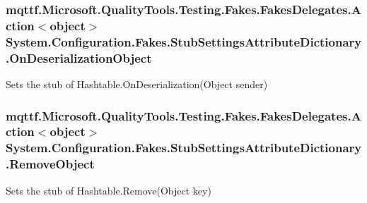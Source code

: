 \hypertarget{class_system_1_1_configuration_1_1_fakes_1_1_stub_settings_attribute_dictionary_abb08597650c205c6c5e972404d81cd6e}{
\subsubsection[{On\-Deserialization\-Object}]{\setlength{\rightskip}{0pt plus 5cm}mqttf.\-Microsoft.\-Quality\-Tools.\-Testing.\-Fakes.\-Fakes\-Delegates.\-Action$<$object$>$ System.\-Configuration.\-Fakes.\-Stub\-Settings\-Attribute\-Dictionary.\-On\-Deserialization\-Object}}\label{class_system_1_1_configuration_1_1_fakes_1_1_stub_settings_attribute_dictionary_abb08597650c205c6c5e972404d81cd6e}


Sets the stub of Hashtable.\-On\-Deserialization(\-Object sender)

\hypertarget{class_system_1_1_configuration_1_1_fakes_1_1_stub_settings_attribute_dictionary_ade81eb54b14e244b2379079139f73c63}{
\subsubsection[{Remove\-Object}]{\setlength{\rightskip}{0pt plus 5cm}mqttf.\-Microsoft.\-Quality\-Tools.\-Testing.\-Fakes.\-Fakes\-Delegates.\-Action$<$object$>$ System.\-Configuration.\-Fakes.\-Stub\-Settings\-Attribute\-Dictionary.\-Remove\-Object}}\label{class_system_1_1_configuration_1_1_fakes_1_1_stub_settings_attribute_dictionary_ade81eb54b14e244b2379079139f73c63}


Sets the stub of Hashtable.\-Remove(\-Object key)

